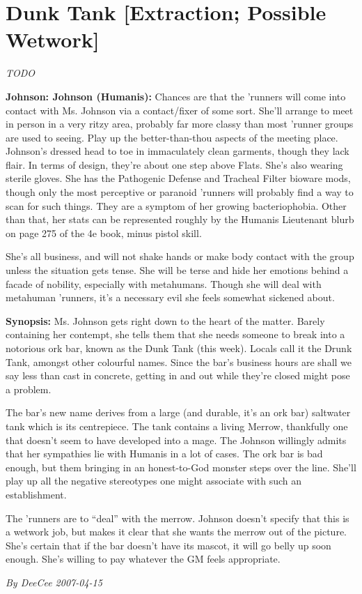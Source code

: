 \documentclass[letterpaper,twocolumn,10.5pt]{article}
\newenvironment{scenario}[6]
	{
		\section{#1 {\small[#2]}}
		\textit{#3}
		\def\TMPSCENARIO{#4 #5}
	}
	{\small\textit{By \TMPSCENARIO}}
\newcommand{\johnson}[2]{\textbf{Johnson: #1 (#2):}}
\newcommand{\synopsis}{\textbf{Synopsis: }}
\begin{document}
\begin{scenario}{Dunk Tank}
	{Extraction; Possible Wetwork}
	{TODO}
	{DeeCee}
	{2007-04-15}
	{https://forum.rpg.net/showthread.php?321504-Shadowrun-4th-101-Instant-Scenarios\&p=7173573#post7173573}

\johnson{Johnson}{Humanis}  Chances are that the 'runners will come into contact with Ms. Johnson via a contact/fixer of some sort. She'll arrange to meet in person in a very ritzy area, probably far more classy than most 'runner groups are used to seeing. Play up the better-than-thou aspects of the meeting place. Johnson's dressed head to toe in immaculately clean garments, though they lack flair. In terms of design, they're about one step above Flats. She's also wearing sterile gloves. She has the Pathogenic Defense and Tracheal Filter bioware mods, though only the most perceptive or paranoid 'runners will probably find a way to scan for such things. They are a symptom of her growing bacteriophobia. Other than that, her stats can be represented roughly by the Humanis Lieutenant blurb on page 275 of the 4e book, minus pistol skill.

She's all business, and will not shake hands or make body contact with the group unless the situation gets tense. She will be terse and hide her emotions behind a facade of nobility, especially with metahumans. Though she will deal with metahuman 'runners, it's a necessary evil she feels somewhat sickened about.

\synopsis  Ms. Johnson gets right down to the heart of the matter. Barely containing her contempt, she tells them that she needs someone to break into a notorious ork bar, known as the Dunk Tank (this week). Locals call it the Drunk Tank, amongst other colourful names. Since the bar's business hours are shall we say less than cast in concrete, getting in and out while they're closed might pose a problem.

The bar's new name derives from a large (and durable, it's an ork bar) saltwater tank which is its centrepiece. The tank contains a living Merrow, thankfully one that doesn't seem to have developed into a mage. The Johnson willingly admits that her sympathies lie with Humanis in a lot of cases. The ork bar is bad enough, but them bringing in an honest-to-God monster steps over the line. She'll play up all the negative stereotypes one might associate with such an establishment.

The 'runners are to ``deal'' with the merrow. Johnson doesn't specify that this is a wetwork job, but makes it clear that she wants the merrow out of the picture. She's certain that if the bar doesn't have its mascot, it will go belly up soon enough. She's willing to pay whatever the GM feels appropriate.


\end{scenario}
\end{document}
